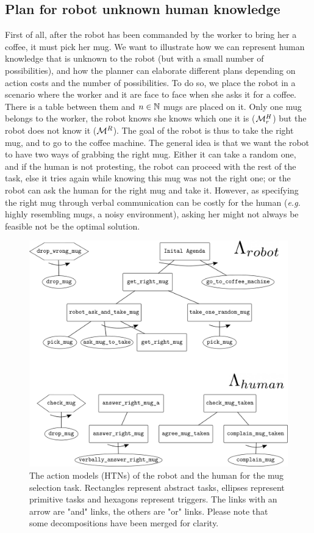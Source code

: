 \documentclass[a4paper,11pt,twoside]{StyleThese}
\begin{document}
\subsection{Plan for robot unknown human knowledge}
First of all, after the robot has been commanded by the worker to bring her a coffee, it must pick her mug. We want to illustrate how we can represent human knowledge that is unknown to the robot (but with a small number of possibilities), and how the planner can elaborate different plans depending on action costs and the number of possibilities. To do so, we place the robot in a scenario where the worker and it are face to face when she asks it for a coffee. There is a table between them and $n \in \mathbb{N}$ mugs are placed on it. Only one mug belongs to the worker, the robot knows she knows which one it is ($\mathcal{M}^H_r$) but the robot does not know it ($\mathcal{M}^R$). The goal of the robot is thus to take the right mug, and to go to the coffee machine. The general idea is that we want the robot to have two ways of grabbing the right mug. Either it can take a random one, and if the human is not protesting, the robot can proceed with the rest of the task, else it tries again while knowing this mug was not the right one; or the robot can ask the human for the right mug and take it. However, as specifying the right mug through verbal communication can be costly for the human (\textit{e.g.} highly resembling mugs, a noisy environment), asking her might not always be feasible not be the optimal solution.

\begin{figure}[hbtp]
\centering
\includegraphics[width=\textwidth]{figures/chapter4/HTN_hr_mugs.png}
\caption{The action models (HTNs) of the robot and the human for the mug selection task. Rectangles represent abstract tasks, ellipses represent primitive tasks and hexagons represent triggers. The links with an arrow are "and" links, the others are "or" links. Please note that some decompositions have been merged for clarity.}
\label{fig:chap4rhhtnmug}
\end{figure}
\end{document}
